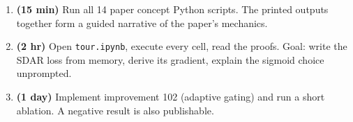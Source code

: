 \documentclass[11pt]{article}
\begin{document}
\begin{enumerate}
  \item \textbf{(15 min)} Run all 14 paper concept Python scripts. The printed outputs together form a guided narrative of the paper's mechanics.
  \item \textbf{(2 hr)} Open \texttt{tour.ipynb}, execute every cell, read the proofs. Goal: write the SDAR loss from memory, derive its gradient, explain the sigmoid choice unprompted.
  \item \textbf{(1 day)} Implement improvement 102 (adaptive gating) and run a short ablation. A negative result is also publishable.
\end{enumerate}
\end{document}
